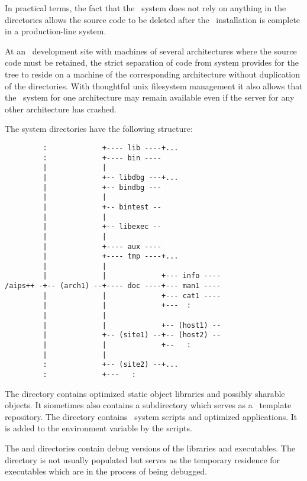 In practical terms, the fact that the \aipspp\ system does not rely on
anything in the  directories allows the source code to be
deleted after the \aipspp\ installation is complete in a production-line
system.

At an \aipspp\ development site with machines of several architectures where
the source code must be retained, the strict separation of code from system
provides for the  tree to reside on a machine of the
corresponding architecture without duplication of the  directories.
With thoughtful unix filesystem management it also allows that the \aipspp\ 
system for one architecture may remain available even if the server for any
other architecture has crashed.

The system directories have the following structure:

\begin{verbatim}
         :             +---- lib ----+...
         :             +---- bin ----
         |             |
         |             +-- libdbg ---+...
         |             +-- bindbg ---
         |             |
         |             +-- bintest --
         |             |
         |             +-- libexec --
         |             |
         |             +---- aux ----
         |             +---- tmp ----+...
         |             |
         |             |             +--- info ----
/aips++ -+-- (arch1) --+---- doc ----+--- man1 ----
         |             |             +--- cat1 ----
         |             |             +---  :
         |             |
         |             |             +-- (host1) --
         |             +-- (site1) --+-- (host2) --
         |             |             +--   :
         |             |
         :             +-- (site2) --+...
         :             +---   :
\end{verbatim}

\noindent
The  directory contains optimized static object libraries and
possibly sharable objects.  It siometimes also contains a subdirectory which
serves as a \cplusplus\ template repository.  The \file{bin} directory
contains \aipspp\ system scripts and optimized applications.  It is added to
the \code{PATH} environment variable by the \exeref{aipsinit} scripts.

The  and  directories contain debug versions of the
libraries and executables.  The \file{bindbg} directory is not usually
populated but serves as the temporary residence for executables which are in
the process of being debugged.

